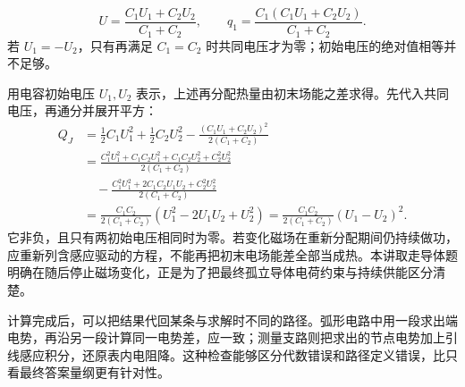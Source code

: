 \[
U=\frac{C_1U_1+C_2U_2}{C_1+C_2},\qquad
q_1=\frac{C_1(C_1U_1+C_2U_2)}{C_1+C_2}.
\]
若 $U_1=-U_2$，只有再满足 $C_1=C_2$ 时共同电压才为零；初始电压的绝对值相等并不足够。


用电容初始电压 $U_1,U_2$ 表示，上述再分配热量由初末场能之差求得。先代入共同电压，再通分并展开平方：
\[
 \begin{aligned}
 Q_J&=\frac12C_1U_1^2+\frac12C_2U_2^2
       -\frac{(C_1U_1+C_2U_2)^2}{2(C_1+C_2)}\\
 &=\frac{C_1^2U_1^2+C_1C_2U_1^2+C_1C_2U_2^2+C_2^2U_2^2}
         {2(C_1+C_2)}\\
 &\quad-\frac{C_1^2U_1^2+2C_1C_2U_1U_2+C_2^2U_2^2}{2(C_1+C_2)}\\
 &=\frac{C_1C_2}{2(C_1+C_2)}(U_1^2-2U_1U_2+U_2^2)
 =\frac{C_1C_2}{2(C_1+C_2)}(U_1-U_2)^2.
 \end{aligned}
\]
它非负，且只有两初始电压相同时为零。若变化磁场在重新分配期间仍持续做功，应重新列含感应驱动的方程，不能再把初末电场能差全部当成热。本讲取走导体题明确在随后停止磁场变化，正是为了把最终孤立导体电荷约束与持续供能区分清楚。


计算完成后，可以把结果代回某条与求解时不同的路径。弧形电路中用一段求出端电势，再沿另一段计算同一电势差，应一致；测量支路则把求出的节点电势加上引线感应积分，还原表内电阻降。这种检查能够区分代数错误和路径定义错误，比只看最终答案量纲更有针对性。


